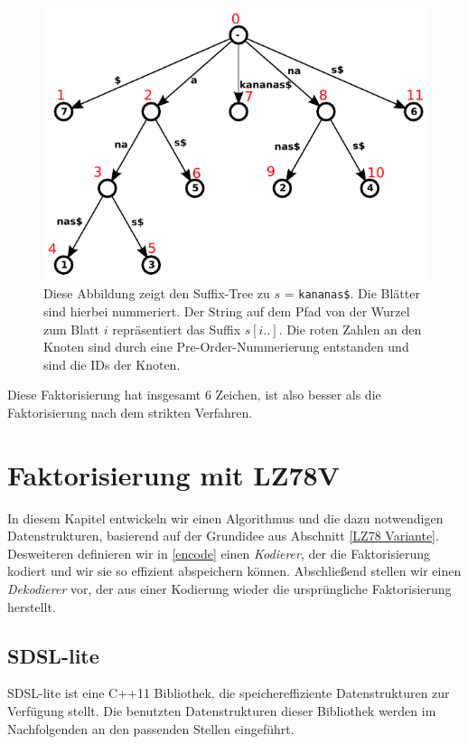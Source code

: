 \documentclass[a4paper,11pt]{scrartcl}%
\theoremstyle{change}
\theoremstyle{nonumberplain}
\theoremstyle{change}
\theoremstyle{nonumberplain}
\theoremstyle{change}
\theoremstyle{nonumberplain}
\begin{document}
\begin{figure}[h]
	    \centering
		\includegraphics[scale=0.75]{./pics/kananas_suffixTree_inorder}
		 \caption{Diese Abbildung zeigt den Suffix-Tree zu $s$ = \texttt{kananas\$}. Die Blätter sind hierbei nummeriert. Der String auf dem Pfad von der Wurzel zum Blatt $i$ repräsentiert das Suffix $s[i..]$. Die roten Zahlen an den Knoten sind durch eine Pre-Order-Nummerierung entstanden und sind die IDs der Knoten.}
		 \label{fig:kananas}
\end{figure}

Diese Faktorisierung hat insgesamt 6 Zeichen, ist also besser als die Faktorisierung nach dem strikten Verfahren.

\section{Faktorisierung mit LZ78V}\label{factorisation}

In diesem Kapitel entwickeln wir einen Algorithmus und die dazu notwendigen Datenstrukturen, basierend auf der Grundidee aus Abschnitt \ref{LZ78 Variante}. 
Desweiteren definieren wir in \autoref{encode} einen \textit{Kodierer}, der die Faktorisierung kodiert und wir sie so effizient abspeichern können.
Abschließend stellen wir einen \textit{Dekodierer} vor, der aus einer Kodierung wieder die ursprüngliche Faktorisierung herstellt.

\subsection{SDSL-lite}
SDSL-lite ist eine C++11 Bibliothek, die speichereffiziente Datenstrukturen zur Verfügung stellt. Die benutzten Datenstrukturen dieser Bibliothek werden im Nachfolgenden an den passenden Stellen eingeführt\cite{sdsl}.
\end{document}
